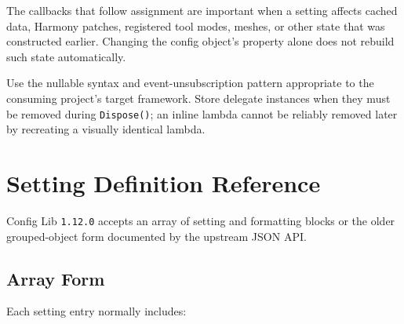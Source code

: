 \documentclass[
  11pt,
  letterpaper,
  titlepage]{article}
\begin{document}
The callbacks that follow assignment are important when a setting
affects cached data, Harmony patches, registered tool modes, meshes, or
other state that was constructed earlier. Changing the config object's
property alone does not rebuild such state automatically.

Use the nullable syntax and event-unsubscription pattern appropriate to
the consuming project's target framework. Store delegate instances when
they must be removed during \texttt{Dispose()}; an inline lambda cannot
be reliably removed later by recreating a visually identical lambda.

\section{Setting Definition
Reference}\label{setting-definition-reference}

Config Lib \texttt{1.12.0} accepts an array of setting and formatting
blocks or the older grouped-object form documented by the upstream JSON
API.

\subsection{Array Form}\label{array-form}

Each setting entry normally includes:
\end{document}
